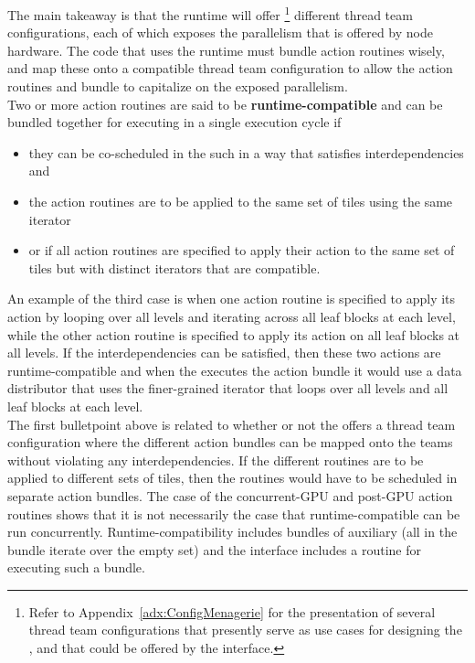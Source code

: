 \documentclass{article}
\begin{document}
The main takeaway is that the runtime will offer \footnote{Refer to
Appendix~\ref{adx:ConfigMenagerie} for the presentation of several thread team
configurations that presently serve as use cases for designing the \OR, and
that could be offered by the \OR interface.} different thread team
configurations, each of which exposes the parallelism that is offered by node
hardware.  The code that uses the runtime must bundle action routines
wisely, and map these onto a compatible thread team configuration to allow the
action routines and bundle to capitalize on the exposed parallelism.\\

Two or more action routines are said to be \textbf{runtime-compatible} and can be
bundled together for executing in a single execution cycle if
\begin{itemize}
\item{they can be co-scheduled in the \OR such in a way that satisfies interdependencies and}
\item{the action routines are to be applied to the same set of tiles using the
same iterator}
\item{ or if all action routines are specified to apply their action to the same set of tiles but
with distinct iterators that are compatible.}
\end{itemize}
An example of the third case is when one action routine
is specified to apply its action by looping over all levels and iterating across
all leaf blocks at each level, while the other action routine is specified to
apply its action on all leaf blocks at all levels.  If the interdependencies can be
satisfied, then these two actions are runtime-compatible and when the \OR
executes the action bundle it would use a data distributor that uses the
finer-grained iterator that loops over all levels and all leaf blocks at each
level.\\

The first bulletpoint above is related to whether or not the \OR offers a thread team
configuration where the different action bundles can be mapped onto the
 teams without violating any interdependencies.
If the different routines are to be applied to different sets of
tiles,  then the routines would have to be scheduled in separate
action bundles.  The case of the concurrent-GPU and post-GPU action routines
shows that it is not necessarily the case that
runtime-compatible \taskroutines can be run concurrently.
Runtime-compatibility includes bundles of auxiliary \taskroutines
(all \taskroutines in the bundle iterate over the
empty set) and the \OR interface includes a routine for executing such a
bundle.\\
\end{document}
